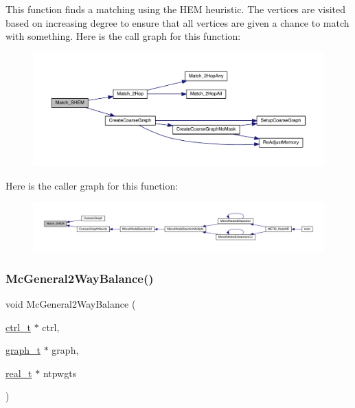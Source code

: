 This function finds a matching using the H\+EM heuristic. The vertices are visited based on increasing degree to ensure that all vertices are given a chance to match with something. Here is the call graph for this function\+:\nopagebreak
\begin{figure}[H]
\begin{center}
\leavevmode
\includegraphics[width=350pt]{a00945_af3ec72f3170ccdca06d8ad018d86cc58_cgraph}
\end{center}
\end{figure}
Here is the caller graph for this function\+:\nopagebreak
\begin{figure}[H]
\begin{center}
\leavevmode
\includegraphics[width=350pt]{a00945_af3ec72f3170ccdca06d8ad018d86cc58_icgraph}
\end{center}
\end{figure}
\mbox{\label{a00945_a765ccbdaa41401e55a2b6d350964f289}} 
\subsubsection{\texorpdfstring{Mc\+General2\+Way\+Balance()}{McGeneral2WayBalance()}}
{\footnotesize\ttfamily void Mc\+General2\+Way\+Balance (\begin{DoxyParamCaption}\item[{\hyperlink{a00742}{ctrl\+\_\+t} $\ast$}]{ctrl,  }\item[{\hyperlink{a00734}{graph\+\_\+t} $\ast$}]{graph,  }\item[{\hyperlink{a00876_a1924a4f6907cc3833213aba1f07fcbe9}{real\+\_\+t} $\ast$}]{ntpwgts }\end{DoxyParamCaption})}

